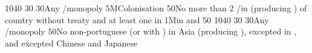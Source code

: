 {10}{40}{}%
%
%
{}{30}{}%
%
%
{}{30}{Any \CTZ/\STZ monopoly}%
%
\EUobjective5M{Colonisation}{}%
{}{50}{No more than 2 \COL/\TP in \continentAsia (producing \POSPICE) of
  country without treaty and at least one \COL in \continentBrazil}%
%
%
%
\EUobjective1M{\TP in \payschine and \paysjapon}{}%
{}{50}{}%
%
%
{10}{40}{}%
%
%
{}{30}{}%
%
%
{}{30}{Any \CTZ/\STZ monopoly}%
%
%
{}{50}{No non-portuguese \TP (or with \dipAT) in Asia (producing \POSPICE),
  excepted in , and excepted Chinese and Japanese
  \TP}%


